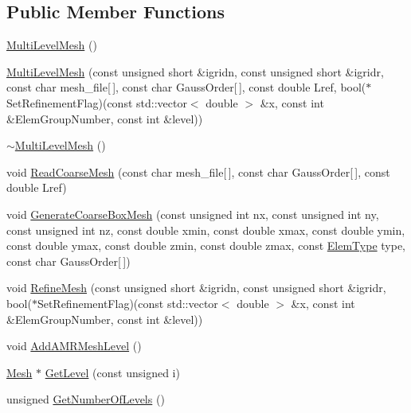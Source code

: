 \subsection*{Public Member Functions}
\begin{DoxyCompactItemize}
\item 
\mbox{\hyperlink{classfemus_1_1_multi_level_mesh_ad33747ccef17dbd00993b7cc5c0dc2e7}{Multi\+Level\+Mesh}} ()
\item 
\mbox{\hyperlink{classfemus_1_1_multi_level_mesh_af4962097722e6de88c1208b0c8d5e803}{Multi\+Level\+Mesh}} (const unsigned short \&igridn, const unsigned short \&igridr, const char mesh\+\_\+file\mbox{[}$\,$\mbox{]}, const char Gauss\+Order\mbox{[}$\,$\mbox{]}, const double Lref, bool($\ast$Set\+Refinement\+Flag)(const std\+::vector$<$ double $>$ \&x, const int \&Elem\+Group\+Number, const int \&level))
\item 
\mbox{\hyperlink{classfemus_1_1_multi_level_mesh_a0d0d182c59b1829677d6cd5f82265ee4}{$\sim$\+Multi\+Level\+Mesh}} ()
\item 
void \mbox{\hyperlink{classfemus_1_1_multi_level_mesh_a29d0d0f9463c9417d390da6149ffc24d}{Read\+Coarse\+Mesh}} (const char mesh\+\_\+file\mbox{[}$\,$\mbox{]}, const char Gauss\+Order\mbox{[}$\,$\mbox{]}, const double Lref)
\item 
void \mbox{\hyperlink{classfemus_1_1_multi_level_mesh_a0988cbee341d6361df77622b3ce65080}{Generate\+Coarse\+Box\+Mesh}} (const unsigned int nx, const unsigned int ny, const unsigned int nz, const double xmin, const double xmax, const double ymin, const double ymax, const double zmin, const double zmax, const \mbox{\hyperlink{_elem_type_enum_8hpp_a1b014294b9757a001707c979e2bab627}{Elem\+Type}} type, const char Gauss\+Order\mbox{[}$\,$\mbox{]})
\item 
void \mbox{\hyperlink{classfemus_1_1_multi_level_mesh_a06c4fe014434c2bafdd2c6e94e018620}{Refine\+Mesh}} (const unsigned short \&igridn, const unsigned short \&igridr, bool($\ast$Set\+Refinement\+Flag)(const std\+::vector$<$ double $>$ \&x, const int \&Elem\+Group\+Number, const int \&level))
\item 
void \mbox{\hyperlink{classfemus_1_1_multi_level_mesh_ab330e756b7e604d5ee809c7fff33c1fb}{Add\+A\+M\+R\+Mesh\+Level}} ()
\item 
\mbox{\hyperlink{classfemus_1_1_mesh}{Mesh}} $\ast$ \mbox{\hyperlink{classfemus_1_1_multi_level_mesh_ae5e4557f7784330822b988d83e2b6a40}{Get\+Level}} (const unsigned i)
\item 
unsigned \mbox{\hyperlink{classfemus_1_1_multi_level_mesh_a89a77678df230dce7f2dd2ff171c71b4}{Get\+Number\+Of\+Levels}} ()

\end{DoxyCompactItemize}
